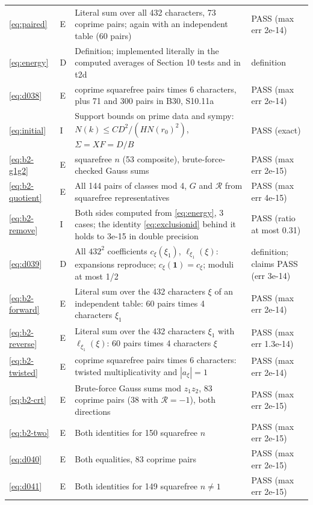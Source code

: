 \documentclass[11pt]{article}
\numberwithin{equation}{section}
\begin{document}
\begin{longtable}{@{}>{\raggedright\arraybackslash}p{1.2cm}>{\centering\arraybackslash}p{0.7cm}>{\raggedright\arraybackslash}p{9.05cm}>{\raggedright\arraybackslash}p{4.3cm}@{}}
\eqref{eq:paired} & E & Literal sum over all 432 characters, 73 coprime pairs; again with an independent table (60 pairs) & PASS (max err 2e-14)\\
\eqref{eq:energy} & D & Definition; implemented literally in the computed averages of Section 10 tests and in t2d & definition\\
\eqref{eq:d038} & E & 120 coprime squarefree pairs times 6 characters, plus 71 and 300 pairs in B30, S10.11a & PASS (max err 2e-14)\\
\eqref{eq:initial} & I & Support bounds on prime data and sympy: $N(k)\le CD^2/(HN(r_0)^2)$, $\Sigma=XF=D/B$ & PASS (exact)\\
\eqref{eq:b2-g1g2} & E & 150 squarefree $n$ (53 composite), brute-force-checked Gauss sums & PASS (max err 2e-15)\\
\eqref{eq:b2-quotient} & E & All 144 pairs of classes mod 4, $G$ and $\mathcal R$ from squarefree representatives & PASS (max err 4e-15)\\
\eqref{eq:b2-remove} & I & Both sides computed from \eqref{eq:energy}, 3 cases; the identity \eqref{eq:exclusionid} behind it holds to 3e-15 in double precision & PASS (ratio at most 0.31)\\
\eqref{eq:d039} & D & All $432^2$ coefficients $c_\xi(\xi_1)$, $\ell_{\xi_1}(\xi)$: expansions reproduce; $c_\xi(\mathbf1)=c_\xi$; moduli at most 1/2 & definition; claims PASS (err 3e-14)\\
\eqref{eq:b2-forward} & E & Literal sum over the 432 characters $\xi$ of an independent table: 60 pairs times 4 characters $\xi_1$ & PASS (max err 2e-14)\\
\eqref{eq:b2-reverse} & E & Literal sum over the 432 characters $\xi_1$ with $\ell_{\xi_1}(\xi)$: 60 pairs times 4 characters $\xi$ & PASS (max err 1.3e-14)\\
\eqref{eq:b2-twisted} & E & 120 coprime squarefree pairs times 6 characters: twisted multiplicativity and $|a_\xi|=1$ & PASS (max err 2e-14)\\
\eqref{eq:b2-crt} & E & Brute-force Gauss sums mod $z_1z_2$, 83 coprime pairs (38 with $\mathcal R=-1$), both directions & PASS (max err 2e-15)\\
\eqref{eq:b2-two} & E & Both identities for 150 squarefree $n$ & PASS (max err 2e-15)\\
\eqref{eq:d040} & E & Both equalities, 83 coprime pairs & PASS (max err 2e-15)\\
\eqref{eq:d041} & E & Both identities for 149 squarefree $n\ne1$ & PASS (max err 2e-15)\\

\end{longtable}
\end{document}
